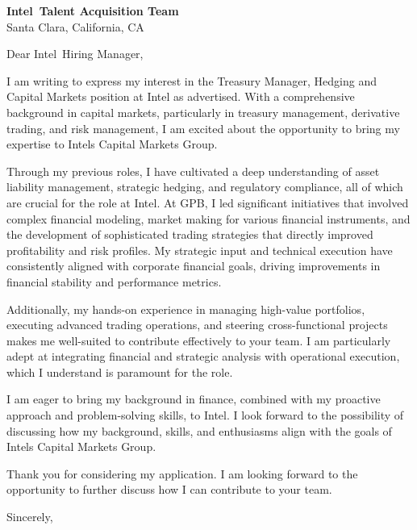 \documentclass{letter}
\newcommand{\company}{Intel}
\begin{document}
\begin{letter}{\textbf{\company\ Talent Acquisition Team} \\                
    Santa Clara, California, CA }

\opening{Dear \company\ Hiring Manager,}

I am writing to express my interest in the Treasury Manager, Hedging and Capital Markets position at Intel as advertised. With a comprehensive background in capital markets, particularly in treasury management, derivative trading, and risk management, I am excited about the opportunity to bring my expertise to Intels Capital Markets Group.

Through my previous roles, I have cultivated a deep understanding of asset liability management, strategic hedging, and regulatory compliance, all of which are crucial for the role at Intel. At GPB, I led significant initiatives that involved complex financial modeling, market making for various financial instruments, and the development of sophisticated trading strategies that directly improved profitability and risk profiles. My strategic input and technical execution have consistently aligned with corporate financial goals, driving improvements in financial stability and performance metrics.

Additionally, my hands-on experience in managing high-value portfolios, executing advanced trading operations, and steering cross-functional projects makes me well-suited to contribute effectively to your team. I am particularly adept at integrating financial and strategic analysis with operational execution, which I understand is paramount for the role.

I am eager to bring my background in finance, combined with my proactive approach and problem-solving skills, to Intel. I look forward to the possibility of discussing how my background, skills, and enthusiasms align with the goals of Intels Capital Markets Group.

Thank you for considering my application. I am looking forward to the opportunity to further discuss how I can contribute to your team.



\closing{Sincerely,}

\end{letter}
\end{document}
